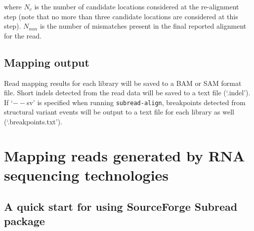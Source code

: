 \documentclass[12pt]{report}
\newcommand{\code}[1]{{\small\texttt{#1}}}
\newcommand{\Subread}{\textsf{Subread}}
\begin{document}
\noindent where $N_c$ is the number of candidate locations considered at the re-alignment step (note that no more than three candidate locations are considered at this step).
$N_{mm}$ is the number of mismatches present in the final reported alignment for the read.





\section{Mapping output}

Read mapping results for each library will be saved to a BAM or SAM format file.
Short indels detected from the read data will be saved to a text file (`.indel').
If `$--$sv' is specified when running \code{subread-align}, breakpoints detected from structural variant events will be output to a text file for each library as well (`.breakpoints.txt').

\newpage



\chapter{Mapping reads generated by RNA sequencing technologies}

\section{A quick start for using SourceForge {\Subread} package}
\end{document}
